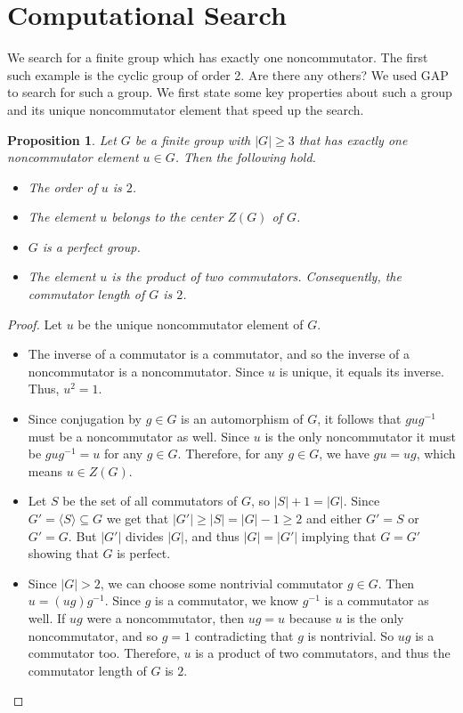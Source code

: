 \documentclass[10pt,leqno]{amsart}
\newtheorem{proposition}[theorem]{Proposition}
\begin{document}
\section{Computational Search}
We search for a finite group which has exactly one noncommutator. The first such example is the cyclic group of order 2. Are there any others? We used GAP to search for such a group. We first state some key properties about such a group and its unique noncommutator element that speed up the search.
\begin{proposition}
Let $G$ be a finite group with $|G|\geq 3$ that has exactly one noncommutator element $u\in G$. Then the following hold.  
\begin{itemize}
            \item The order of $u$ is $2$.
            \item The element $u$ belongs to the center $Z(G)$ of $G$.
            \item $G$ is a perfect group.
            \item The element $u$ is the product of two commutators. Consequently, the commutator length of $G$ is $2$.
\end{itemize}
\label{four_props}
\end{proposition}
\begin{proof} Let $u$ be the unique noncommutator element of $G$.
\begin{itemize}
    \item The inverse of a commutator is a commutator, and so the inverse of a noncommutator is a noncommutator. Since $u$ is unique, it equals its inverse. Thus, $u^2 = 1$.
    \item Since conjugation by $g\in G$ is an automorphism of $G$, it follows that $gug^{-1}$ must be a noncommutator as well. Since $u$ is the only noncommutator it must be $gug^{-1}=u$ for any $g\in G$.  Therefore, for any $g\in G$, we have $gu=ug$, which means $u \in Z(G)$.
    \item Let $S$ be the set of all commutators of $G$, so $|S|+1=|G|$. Since $G'=\langle S \rangle\subseteq G$ we get that $|G'|\geq |S| = |G|-1\geq 2$ and either $G'=S$ or $G'=G$. But $|G'|$ divides $|G|$, and thus $|G|=|G'|$ implying that $G=G'$ showing that $G$ is perfect.
    \item Since $|G| > 2$, we can choose some nontrivial commutator $g\in G$. Then $u=(ug)g^{-1}$. Since $g$ is a commutator, we know $g^{-1}$ is a commutator as well. If $ug$ were a noncommutator, then $ug=u$ because $u$ is the only noncommutator, and so $g=1$ contradicting that $g$ is nontrivial. So $ug$ is a commutator too. Therefore, $u$ is a product of two commutators, and thus the commutator length of $G$ is $2$.
\end{itemize}
\end{proof}
\end{document}

